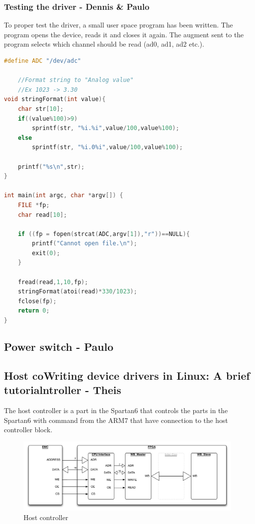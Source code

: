 \subsubsection{Testing the driver - Dennis \& Paulo}
To proper test the driver, a small user space program has been written. The program opens the device, reads it and closes it again.
The augment sent to the program selects which channel should be read (ad0, ad1, ad2 etc.).

\begin{lstlisting}[language=c]
#define ADC "/dev/adc"
	
	//Format string to "Analog value"
	//Ex 1023 -> 3.30
void stringFormat(int value){
	char str[10];
	if((value%100)>9)
		sprintf(str, "%i.%i",value/100,value%100);
 	else
 		sprintf(str, "%i.0%i",value/100,value%100);
 		
	printf("%s\n",str);
}

int main(int argc, char *argv[]) {
	FILE *fp;
	char read[10];

	if ((fp = fopen(strcat(ADC,argv[1]),"r"))==NULL){
		printf("Cannot open file.\n");
		exit(0);
	}
	
	fread(read,1,10,fp);
	stringFormat(atoi(read)*330/1023);
	fclose(fp);
	return 0;
}
\end{lstlisting}



\subsection{Power switch - Paulo}

\subsection{Host coWriting device drivers in Linux: A brief tutorialntroller - Theis}
The host controller is a part in the Spartan6 that controls the parts in the Spartan6 with command from the ARM7 that have connection to the host controller block.
\begin{figure}[H]
	\begin{centering}
		 \includegraphics[width=1.0\textwidth]{images/host_controller.pdf}
		\caption{Host controller}
	\end{centering}
\end{figure}
